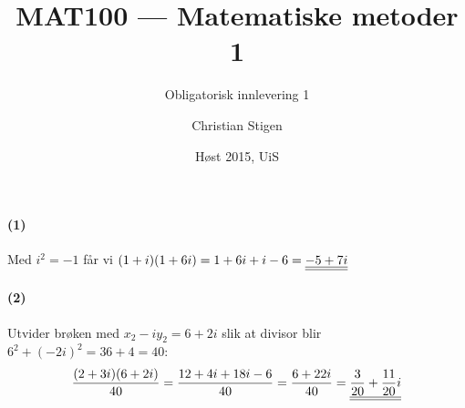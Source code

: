\documentclass[a4paper,norsk,12pt]{article}
\title{MAT100 --- Matematiske metoder 1}
\subtitle{Obligatorisk innlevering 1}
\author{Christian Stigen}
\date{Høst 2015, UiS}
\begin{document}
\maketitle


\paragraph{(1)}
Med $i^2 = -1$ får vi
\begin{math}
  (1+i)(1+6i) = 1+6i+i-6 = {\underline{\underline{-5+7i}}}
\end{math}

\paragraph{(2)}
Utvider brøken med $x_2 - iy_2 = 6 + 2i$ slik at divisor blir
$6^2+(-2i)^2 = 36 + 4 = 40$:
\begin{dmath}
  \frac{(2+3i)(6+2i)}{40} = \frac{12+4i+18i-6}{40}
  = \frac{6+22i}{40} = \svar{\frac{3}{20} + \frac{11}{20}i}
\end{dmath}


\end{document}
